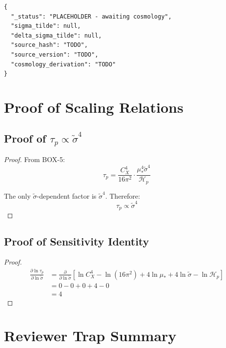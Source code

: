 \documentclass[11pt,letterpaper]{article}
\newcommand{\st}{\tilde{\sigma}}
\newcommand{\Hp}{\mathcal{H}_p}
\begin{document}
\begin{verbatim}
{
  "_status": "PLACEHOLDER - awaiting cosmology",
  "sigma_tilde": null,
  "delta_sigma_tilde": null,
  "source_hash": "TODO",
  "source_version": "TODO",
  "cosmology_derivation": "TODO"
}
\end{verbatim}

\section{Proof of Scaling Relations}
\label{app:scaling-proofs}

\subsection{Proof of $\tau_p \propto \st^4$}
\label{app:taup-proof}

\begin{proof}
From BOX-5:
\begin{equation}
\tau_p = \frac{C_X^4}{16\pi^2} \cdot \frac{\mu_*^4 \st^4}{\Hp}
\label{eq:taup-full}
\end{equation}

The only $\st$-dependent factor is $\st^4$. Therefore:
\begin{equation}
\tau_p \propto \st^4
\label{eq:taup-propto}
\end{equation}
\end{proof}

\subsection{Proof of Sensitivity Identity}
\label{app:sensitivity-proof}

\begin{proof}
\begin{align}
\frac{\partial \ln \tau_p}{\partial \ln \st} &= \frac{\partial}{\partial \ln \st} \left[ \ln C_X^4 - \ln(16\pi^2) + 4\ln\mu_* + 4\ln\st - \ln\Hp \right] \\
&= 0 - 0 + 0 + 4 - 0 \\
&= 4
\end{align}
\end{proof}

\section{Reviewer Trap Summary}
\label{app:reviewer-traps}
\end{document}
